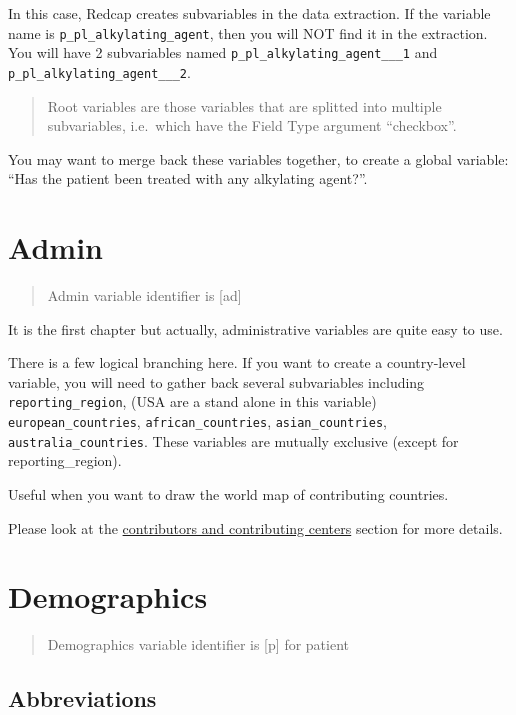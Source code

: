 \documentclass[
]{book}
\begin{document}
In this case, Redcap creates subvariables in the data extraction. If the variable name is \texttt{p\_pl\_alkylating\_agent}, then you will NOT find it in the extraction. You will have 2 subvariables named \texttt{p\_pl\_alkylating\_agent\_\_\_1} and \texttt{p\_pl\_alkylating\_agent\_\_\_2}.

\begin{quote}
Root variables are those variables that are splitted into multiple subvariables, i.e.~which have the Field Type argument ``checkbox''.
\end{quote}

You may want to merge back these variables together, to create a global variable: ``Has the patient been treated with any alkylating agent?''.

\hypertarget{admin}{%
\chapter{Admin}\label{admin}}

\begin{quote}
Admin variable identifier is {[}ad{]}
\end{quote}

It is the first chapter but actually, administrative variables are quite easy to use.

There is a few logical branching here. If you want to create a country-level variable, you will need to gather back several subvariables including \texttt{reporting\_region}, (USA are a stand alone in this variable) \texttt{european\_countries}, \texttt{african\_countries}, \texttt{asian\_countries}, \texttt{australia\_countries}. These variables are mutually exclusive (except for reporting\_region).

Useful when you want to draw the world map of contributing countries.

Please look at the \protect\hyperlink{contrib}{contributors and contributing centers} section for more details.

\hypertarget{demo}{%
\chapter{Demographics}\label{demo}}

\begin{quote}
Demographics variable identifier is {[}p{]} for patient
\end{quote}

\hypertarget{abbreviations}{%
\section{Abbreviations}\label{abbreviations}}
\end{document}
